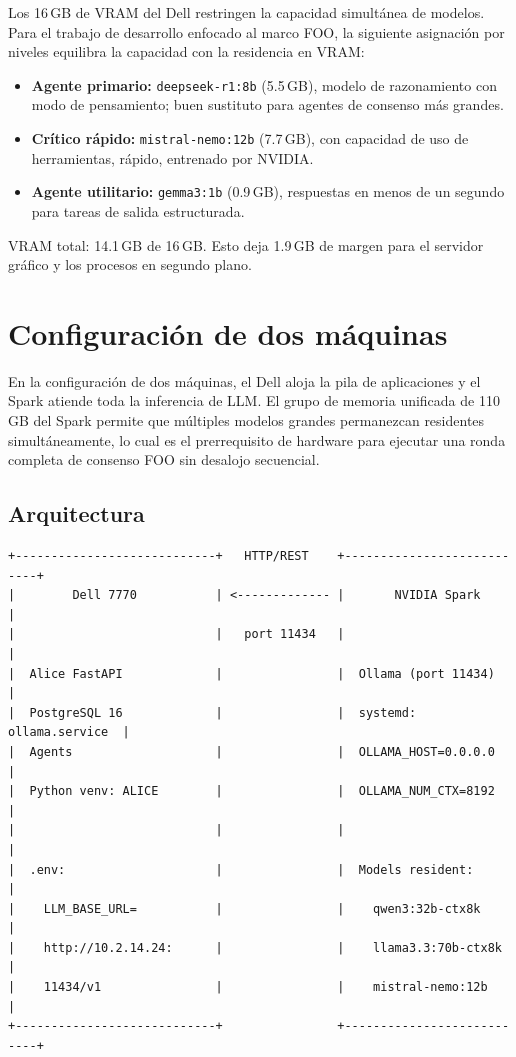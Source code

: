 Los 16\,GB de VRAM del Dell restringen la capacidad simultánea de modelos.
Para el trabajo de desarrollo enfocado al marco FOO, la siguiente
asignación por niveles equilibra la capacidad con la residencia en VRAM:

\begin{itemize}
  \item \textbf{Agente primario:} \texttt{deepseek-r1:8b} (5.5\,GB),
        modelo de razonamiento con modo de pensamiento; buen sustituto
        para agentes de consenso más grandes.
  \item \textbf{Crítico rápido:} \texttt{mistral-nemo:12b} (7.7\,GB),
        con capacidad de uso de herramientas, rápido, entrenado por NVIDIA.
  \item \textbf{Agente utilitario:} \texttt{gemma3:1b} (0.9\,GB),
        respuestas en menos de un segundo para tareas de salida estructurada.
\end{itemize}

VRAM total: 14.1\,GB de 16\,GB. Esto deja 1.9\,GB de margen para el
servidor gráfico y los procesos en segundo plano.

\section{Configuración de dos máquinas}
\label{sec:two-machine}

En la configuración de dos máquinas, el Dell aloja la pila de aplicaciones
y el Spark atiende toda la inferencia de LLM. El grupo de memoria unificada
de 110\,GB del Spark permite que múltiples modelos grandes permanezcan
residentes simultáneamente, lo cual es el prerrequisito de hardware para
ejecutar una ronda completa de consenso FOO sin desalojo secuencial.

\subsection{Arquitectura}

\begin{verbatim}
+----------------------------+   HTTP/REST    +---------------------------+
|        Dell 7770           | <------------- |       NVIDIA Spark        |
|                            |   port 11434   |                           |
|  Alice FastAPI             |                |  Ollama (port 11434)      |
|  PostgreSQL 16             |                |  systemd: ollama.service  |
|  Agents                    |                |  OLLAMA_HOST=0.0.0.0      |
|  Python venv: ALICE        |                |  OLLAMA_NUM_CTX=8192      |
|                            |                |                           |
|  .env:                     |                |  Models resident:         |
|    LLM_BASE_URL=           |                |    qwen3:32b-ctx8k        |
|    http://10.2.14.24:      |                |    llama3.3:70b-ctx8k     |
|    11434/v1                |                |    mistral-nemo:12b       |
+----------------------------+                +---------------------------+
\end{verbatim}

